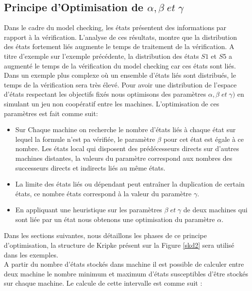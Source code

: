 
\subsection{Principe d'Optimisation de $\alpha, \beta\; et\; \gamma$}
 
Dans le cadre du model checking, les états présentent des informations par rapport à la vérification. L’analyse de ces résultats, montre que la distribution des états fortement liés augmente le temps de traitement de la vérification. A titre d'exemple sur l'exemple précédente, la distribution des états $S1$ et $S5$ a augmenté le temps de la vérification du model checking car ces états sont liés. Dans un exemple plus complexe o\`{u} un ensemble d’états liés sont distribués, le temps de la vérification sera très élevé. Pour avoir une distribution de l'espace d'états respectant les objectifs fixés nous optimisons des paramètres $\alpha, \beta \; et\; \gamma)$ en simulant un jeu non coopératif entre les machines. L'optimisation de ces paramètres est fait comme suit:
\begin{itemize}
	\item Sur Chaque machine on recherche le nombre d'états liés à chaque état sur lequel la formule n'est pa vérifiée, le paramètre $\beta$ pour cet état est égale à ce nombre. Les états local qui disposent des prédécesseurs directs sur d'autres machines distantes, la valeurs du paramètre correspond aux nombres des successeurs directs et indirects liés au même états.
	\item La limite des états liés ou dépendant peut entraîner la duplication de certain états, ce nombre états correspond à la valeur du paramètre $\gamma$. 
	\item En appliquant une heuristique sur les paramètres $\beta \; et\; \gamma$ de deux machines qui sont liée par un état nous obtenons une optimisation du paramètre $\alpha$.
\end{itemize}
Dans les sections suivantes, nous détaillons les phases de ce principe d'optimisation, la structure de Kripke présent sur la Figure \ref{skd2} sera utilisé dans les exemples. \\

A partir du nombre d'états stockés dans machine il est possible de calculer entre deux machine le nombre minimum et maximum d’états susceptibles d’être stockés sur chaque machine. Le calcule de cette intervalle est comme suit :

